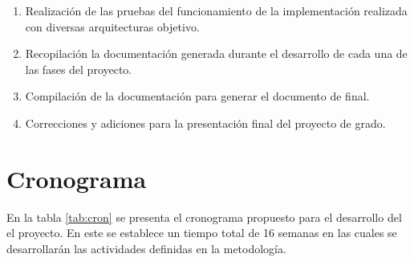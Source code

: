 \documentclass[12pt]{article}
\begin{document}
\begin{enumerate}[label=\thesubsection.\arabic*., wide, labelindent=2em, leftmargin=5em]
	\item Realización de las pruebas del funcionamiento de la implementación realizada con diversas arquitecturas objetivo.
	\item Recopilación la documentación generada durante el desarrollo de cada una de las fases del proyecto.
	\item Compilación de la documentación para generar el documento de final.
	\item Correcciones y adiciones para la presentación final del proyecto de grado.
\end{enumerate}


\pagebreak

\section{Cronograma}

En la tabla \ref{tab:cron} se presenta el cronograma propuesto para el desarrollo del el proyecto. En este se establece un tiempo total de 16 semanas en las cuales se desarrollarán las actividades definidas en la metodología.
\end{document}
